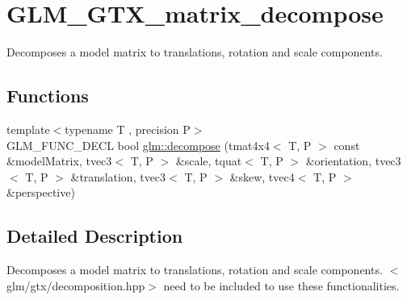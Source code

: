 \hypertarget{group__gtx__matrix__decompose}{\section{G\-L\-M\-\_\-\-G\-T\-X\-\_\-matrix\-\_\-decompose}
\label{group__gtx__matrix__decompose}
}


Decomposes a model matrix to translations, rotation and scale components.  


\subsection*{Functions}
\begin{DoxyCompactItemize}
\item 
{\footnotesize template$<$typename T , precision P$>$ }\\G\-L\-M\-\_\-\-F\-U\-N\-C\-\_\-\-D\-E\-C\-L bool \hyperlink{group__gtx__matrix__decompose_ga0f1245817507156b337798a253577c8b}{glm\-::decompose} (tmat4x4$<$ T, P $>$ const \&model\-Matrix, tvec3$<$ T, P $>$ \&scale, tquat$<$ T, P $>$ \&orientation, tvec3$<$ T, P $>$ \&translation, tvec3$<$ T, P $>$ \&skew, tvec4$<$ T, P $>$ \&perspective)
\end{DoxyCompactItemize}


\subsection{Detailed Description}
Decomposes a model matrix to translations, rotation and scale components. $<$glm/gtx/decomposition.\-hpp$>$ need to be included to use these functionalities. 

